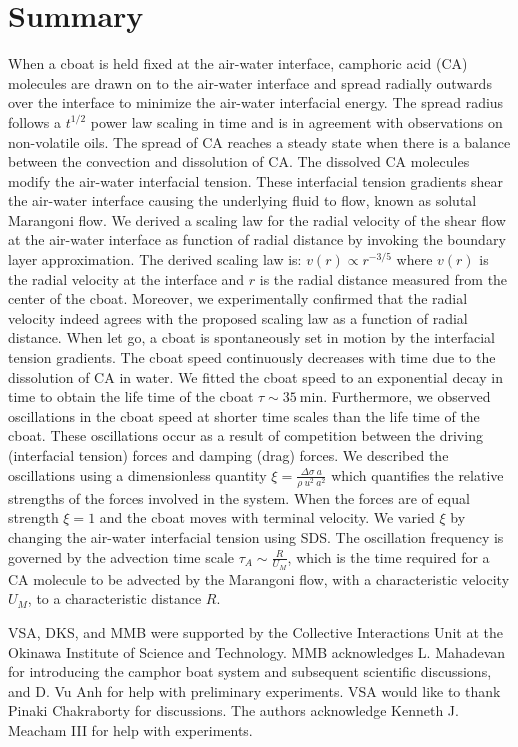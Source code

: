 \documentclass[journal=langd5, manuscript=article, layout=twocolumn]{achemso}
\begin{document}
\section{Summary}
\label{sec:summary}
When a cboat is held fixed at the air-water interface, camphoric acid (CA) molecules are drawn on to the air-water interface and spread radially outwards over the interface to minimize the air-water interfacial energy. The spread radius follows a $t^{1/2}$ power law scaling in time and is in agreement with observations on non-volatile oils\cite{troian1998}. The spread of CA reaches a steady state when there is a balance between the convection and dissolution of CA. The dissolved CA molecules modify the air-water interfacial tension. These interfacial tension gradients shear the air-water interface causing the underlying fluid to flow, known as solutal Marangoni flow. We derived a scaling law for the radial velocity of the shear flow at the air-water interface as function of radial distance by invoking the boundary layer approximation. The derived scaling law is: $v(r) \propto r^{-3/5}$ where $v(r)$ is the radial velocity at the interface and $r$ is the radial distance measured from the center of the cboat. Moreover, we experimentally confirmed that the radial velocity indeed agrees with the proposed scaling law as a function of radial distance. When let go, a cboat is spontaneously set in motion by the interfacial tension gradients. The cboat speed continuously decreases with time due to the dissolution of CA in water. We fitted the cboat speed to an exponential decay in time to obtain the life time of the cboat $\tau \sim 35\ \mathrm{min}$. Furthermore, we observed oscillations in the cboat speed at shorter time scales than the life time of the cboat. These oscillations occur as a result of competition between the driving (interfacial tension) forces and damping (drag) forces. We described the oscillations using a dimensionless quantity $\xi = \frac{\Delta\sigma\ a}{\rho\ u^{2}\ a^{2}}$ which quantifies the relative strengths of the forces involved in the system. When the forces are of equal strength $\xi = 1$ and the cboat moves with terminal velocity. We varied $\xi$ by changing the air-water interfacial tension using SDS. The oscillation frequency is governed by the advection time scale $\tau_{A} \sim \frac{R}{U_{M}}$, which is the time required for a CA molecule to be advected by the Marangoni flow, with a characteristic velocity $U_{M}$, to a characteristic distance $R$.

\begin{acknowledgement}
VSA, DKS, and MMB were supported by the Collective Interactions Unit at the Okinawa Institute of Science and Technology. MMB acknowledges L. Mahadevan for introducing the camphor boat system and subsequent scientific discussions, and D. Vu Anh for help with preliminary experiments. VSA would like to thank Pinaki Chakraborty for discussions. The authors acknowledge Kenneth J. Meacham III for help with experiments.
\end{acknowledgement}
\end{document}
